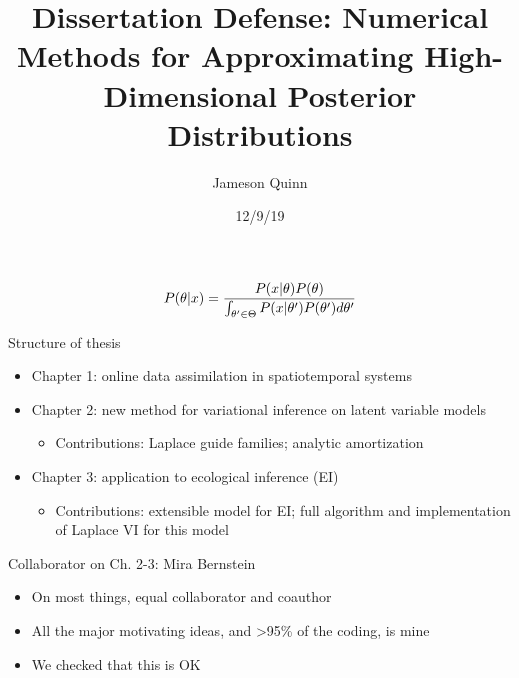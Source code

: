 \documentclass[
  ignorenonframetext,
]{beamer}
\title{Dissertation Defense: Numerical Methods for Approximating
High-Dimensional Posterior Distributions}
\author{Jameson Quinn}
\date{12/9/19}
\providecommand{\tightlist}{%
  \setlength{\itemsep}{0pt}\setlength{\parskip}{0pt}}
\begin{document}
\frame{\titlepage}

\begin{frame}{}
\protect\hypertarget{section}{}

\[\huge{P(\theta|x)=\frac{P(x|\theta)P(\theta)}{\int_{\theta'\in\Theta} P(x|\theta')P(\theta')d\theta'}}\]

\end{frame}

\begin{frame}{Structure of thesis}
\protect\hypertarget{structure-of-thesis}{}

\begin{itemize}
\tightlist
\item
  Chapter 1: online data assimilation in spatiotemporal systems
\item
  Chapter 2: new method for variational inference on latent variable
  models

  \begin{itemize}
  \tightlist
  \item
    Contributions: Laplace guide families; analytic amortization
  \end{itemize}
\item
  Chapter 3: application to ecological inference (EI)

  \begin{itemize}
  \tightlist
  \item
    Contributions: extensible model for EI; full algorithm and
    implementation of Laplace VI for this model
  \end{itemize}
\end{itemize}

\end{frame}

\begin{frame}{Collaborator on Ch. 2-3: Mira Bernstein}
\protect\hypertarget{collaborator-on-ch.-2-3-mira-bernstein}{}

\begin{itemize}
\tightlist
\item
  On most things, equal collaborator and coauthor
\item
  All the major motivating ideas, and \textgreater{}95\% of the coding,
  is mine
\item
  We checked that this is OK
\end{itemize}

\end{frame}
\end{document}
